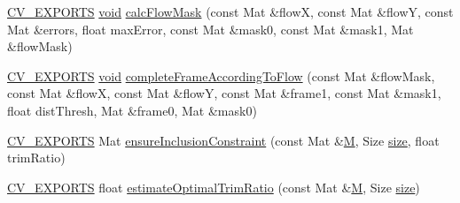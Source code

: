 \begin{DoxyCompactItemize}
\item 
\hyperlink{core_2types__c_8h_a1bf9f0e121b54272da02379cfccd0a2b}{C\-V\-\_\-\-E\-X\-P\-O\-R\-T\-S} \hyperlink{legacy_8hpp_a8bb47f092d473522721002c86c13b94e}{void} \hyperlink{namespacecv_1_1videostab_a779386052e4db6983f4c3eca911b0da1}{calc\-Flow\-Mask} (const Mat \&flow\-X, const Mat \&flow\-Y, const Mat \&errors, float max\-Error, const Mat \&mask0, const Mat \&mask1, Mat \&flow\-Mask)
\item 
\hyperlink{core_2types__c_8h_a1bf9f0e121b54272da02379cfccd0a2b}{C\-V\-\_\-\-E\-X\-P\-O\-R\-T\-S} \hyperlink{legacy_8hpp_a8bb47f092d473522721002c86c13b94e}{void} \hyperlink{namespacecv_1_1videostab_ac1b128280dd3363014289925c9eb7553}{complete\-Frame\-According\-To\-Flow} (const Mat \&flow\-Mask, const Mat \&flow\-X, const Mat \&flow\-Y, const Mat \&frame1, const Mat \&mask1, float dist\-Thresh, Mat \&frame0, Mat \&mask0)
\item 
\hyperlink{core_2types__c_8h_a1bf9f0e121b54272da02379cfccd0a2b}{C\-V\-\_\-\-E\-X\-P\-O\-R\-T\-S} Mat \hyperlink{namespacecv_1_1videostab_a9bc2ca33bdf58cb097baeb82e8e14b7f}{ensure\-Inclusion\-Constraint} (const Mat \&\hyperlink{tracking_8hpp_aa81fa9fd378ecf463757e9274a136e70}{M}, Size \hyperlink{legacy_8hpp_ae97003f8d5c64cdfb99f6f2606d121b6}{size}, float trim\-Ratio)
\item 
\hyperlink{core_2types__c_8h_a1bf9f0e121b54272da02379cfccd0a2b}{C\-V\-\_\-\-E\-X\-P\-O\-R\-T\-S} float \hyperlink{namespacecv_1_1videostab_a108478cbfb161c3f4a689cc1fd22305d}{estimate\-Optimal\-Trim\-Ratio} (const Mat \&\hyperlink{tracking_8hpp_aa81fa9fd378ecf463757e9274a136e70}{M}, Size \hyperlink{legacy_8hpp_ae97003f8d5c64cdfb99f6f2606d121b6}{size})
\end{DoxyCompactItemize}


